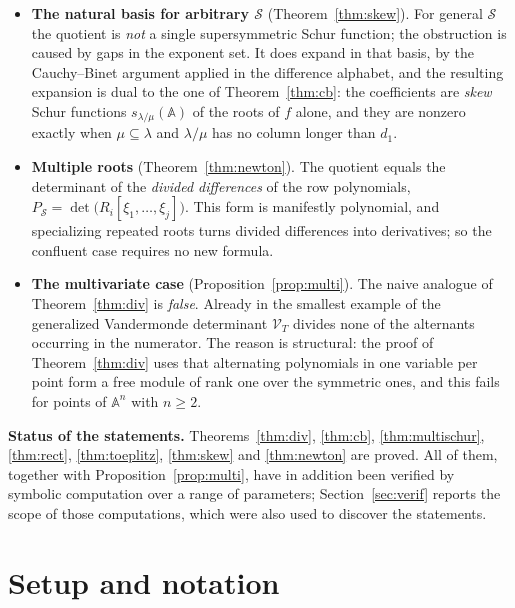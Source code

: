 \documentclass[11pt,reqno]{amsart}
\theoremstyle{plain}
\theoremstyle{definition}
\newcommand{\bA}{\mathbb{A}}
\newcommand{\cS}{\mathcal{S}}
\newcommand{\cV}{\mathcal{V}}
\begin{document}
\begin{itemize}
\item \textbf{The natural basis for arbitrary $\cS$} (Theorem~\ref{thm:skew}).
For general $\cS$ the quotient is \emph{not} a single supersymmetric Schur
function; the obstruction is caused by gaps in the exponent set. It does expand in
that basis, by the Cauchy--Binet argument applied in the difference alphabet, and
the resulting expansion is dual to the one of Theorem~\ref{thm:cb}: the
coefficients are \emph{skew} Schur functions $s_{\lambda/\mu}(\bA)$ of the roots
of $f$ alone, and they are nonzero exactly when $\mu\subseteq\lambda$ and
$\lambda/\mu$ has no column longer than $d_1$.

\item \textbf{Multiple roots} (Theorem~\ref{thm:newton}). The quotient equals the
determinant of the \emph{divided differences} of the row polynomials,
$P_\cS=\det\big(R_i[\xi_1,\dots,\xi_j]\big)$. This form is manifestly polynomial,
and specializing repeated roots turns divided differences into derivatives; so the
confluent case requires no new formula.

\item \textbf{The multivariate case} (Proposition~\ref{prop:multi}). The naive
analogue of Theorem~\ref{thm:div} is \emph{false}. Already in the smallest
example of \cite[Ex.~3.4]{DKS05} the generalized Vandermonde determinant $\cV_T$
divides none of the alternants occurring in the numerator. The reason is
structural: the proof of Theorem~\ref{thm:div} uses that alternating polynomials
in one variable per point form a free module of rank one over the symmetric ones,
and this fails for points of $\mathbb{A}^n$ with $n\ge 2$.
\end{itemize}

\medskip
\noindent\textbf{Status of the statements.} Theorems~\ref{thm:div},
\ref{thm:cb}, \ref{thm:multischur}, \ref{thm:rect}, \ref{thm:toeplitz},
\ref{thm:skew} and \ref{thm:newton} are proved. All of them, together with
Proposition~\ref{prop:multi}, have in addition been verified by symbolic
computation over a range of parameters; Section~\ref{sec:verif} reports the
scope of those computations, which were also used to discover the statements.

\section{Setup and notation}\label{sec:setup}
\end{document}
